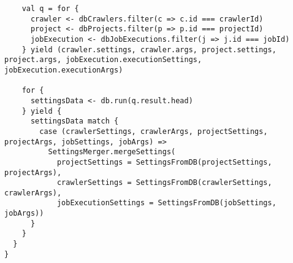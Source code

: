 \begin{lstlisting}
    val q = for {
      crawler <- dbCrawlers.filter(c => c.id === crawlerId)
      project <- dbProjects.filter(p => p.id === projectId)
      jobExecution <- dbJobExecutions.filter(j => j.id === jobId)
    } yield (crawler.settings, crawler.args, project.settings, project.args, jobExecution.executionSettings, jobExecution.executionArgs)

    for {
      settingsData <- db.run(q.result.head)
    } yield {
      settingsData match {
        case (crawlerSettings, crawlerArgs, projectSettings, projectArgs, jobSettings, jobArgs) =>
          SettingsMerger.mergeSettings(
            projectSettings = SettingsFromDB(projectSettings, projectArgs),
            crawlerSettings = SettingsFromDB(crawlerSettings, crawlerArgs),
            jobExecutionSettings = SettingsFromDB(jobSettings, jobArgs))
      }
    }
  }
}
\end{lstlisting}
